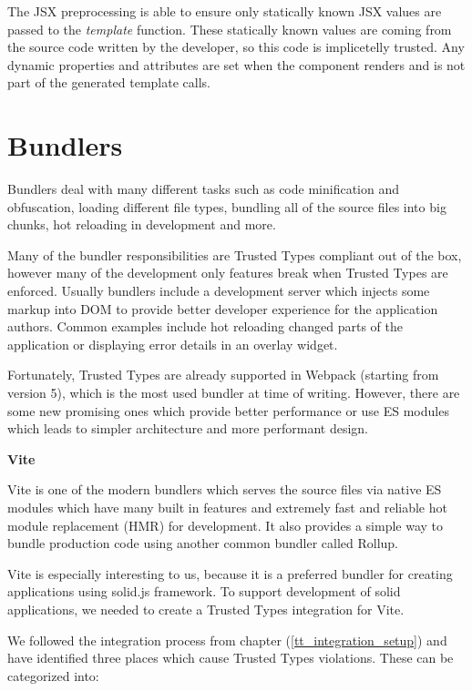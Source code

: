 The JSX preprocessing is able to ensure only statically known JSX values are passed to the
\emph{template} function. These statically known values are coming from the source code written by
the developer, so this code is implicetelly trusted. Any dynamic properties and attributes are set
when the component renders and is not part of the generated template calls.

\section{Bundlers}

Bundlers deal with many different tasks such as code minification and obfuscation, loading different
file types, bundling all of the source files into big chunks, hot reloading in development and more.

Many of the bundler responsibilities are Trusted Types compliant out of the box, however many of the
development only features break when Trusted Types are enforced. Usually bundlers include a
development server which injects some markup into DOM to provide better developer experience for the
application authors. Common examples include hot reloading changed parts of the application or
displaying error details in an overlay widget.

Fortunately, Trusted Types are already supported in Webpack (starting from version 5), which is the
most used bundler at time of writing. However, there are some new promising ones which provide
better performance or use ES modules which leads to simpler architecture and more performant design.

\medskip
\begin{flushleft}\textbf {Vite}\end{flushleft}
\medskip

Vite is one of the modern bundlers which serves the source files via native ES modules which have
many built in features and extremely fast and reliable hot module replacement (HMR) for development.
It also provides a simple way to bundle production code using another common bundler called Rollup.

Vite is especially interesting to us, because it is a preferred bundler for creating applications
using solid.js framework. To support development of solid applications, we needed to create a
Trusted Types integration for Vite.

We followed the integration process from chapter (\ref{tt_integration_setup}) and have identified
three places which cause Trusted Types violations. These can be categorized into:

